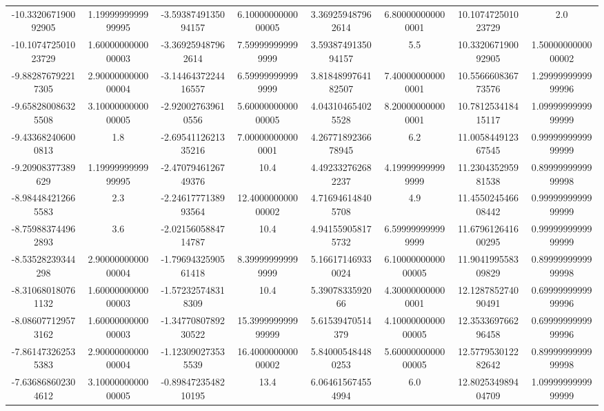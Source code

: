 \begin{table}
\begin{tabular}{S[]S[]S[]S[]S[]S[]S[]S[]}
-10.332067190092905 & 1.1999999999999995    & -3.5938749135094157 & 6.1000000000000005  & 3.369259487962614 & 6.800000000000001   & 10.107472501023729 & 2.0\\
-10.107472501023729 & 1.6000000000000003    & -3.369259487962614 & 7.599999999999999    & 3.5938749135094157 & 5.5                & 10.332067190092905 & 1.5000000000000002\\
-9.882876792217305 & 2.9000000000000004     & -3.1446437224416557 & 6.599999999999999   & 3.8184899764182507 & 7.400000000000001  & 10.556660836773576 & 1.2999999999999996\\
-9.658280086325508 & 3.1000000000000005     & -2.920027639610556 & 5.6000000000000005   & 4.043104654025528 & 8.200000000000001   & 10.781253418415117 & 1.0999999999999999\\
-9.433682406000813 & 1.8                    & -2.6954112621335216 & 7.000000000000001   & 4.2677189236678945 & 6.2                & 11.005844912367545 & 0.9999999999999999\\
-9.20908377389629 & 1.1999999999999995      & -2.4707946126749376 & 10.4                & 4.492332762682237 & 4.199999999999999   & 11.230435295981538 & 0.8999999999999998\\
-8.984484212665583 & 2.3                    & -2.2461777138993564 & 12.400000000000002  & 4.716946148405708 & 4.9                 & 11.455024546608442 & 0.9999999999999999\\
-8.759883744962893 & 3.6                    & -2.0215605884714787 & 10.4                & 4.941559058175732 & 6.599999999999999   & 11.679612641600295 & 0.9999999999999999\\
-8.53528239344298 & 2.9000000000000004      & -1.7969432590561418 & 8.399999999999999   & 5.166171469330024 & 6.1000000000000005  & 11.904199558309829 & 0.8999999999999998\\
-8.310680180761132 & 1.6000000000000003     & -1.572325748318309 & 10.4                 & 5.3907833592066 & 4.300000000000001     & 12.128785274090491 & 0.6999999999999996\\
-8.086077129573162 & 1.6000000000000003     & -1.3477080789230522 & 15.399999999999999  & 5.61539470514379 & 4.1000000000000005   & 12.353369766296458 & 0.6999999999999996\\
-7.861473262535383 & 2.9000000000000004     & -1.123090273535539 & 16.400000000000002   & 5.840005484480253 & 5.6000000000000005  & 12.577953012282642 & 0.8999999999999998\\
-7.636868602304612 & 3.1000000000000005     & -0.8984723548210195 & 13.4                & 6.064615674554994 & 6.0                 & 12.802534989404709 & 1.0999999999999999\\

\end{tabular}
\end{table}
